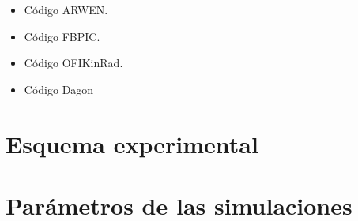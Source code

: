 \begin{itemize}

    \item Código ARWEN.
    \item Código FBPIC.
    \item Código OFIKinRad.
    \item Código Dagon

\end{itemize}






\section{Esquema experimental}\label{sec:3.3}

\section{Parámetros de las simulaciones}\label{sec:3.4}
